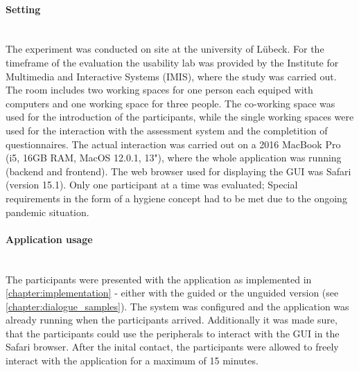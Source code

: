 \documentclass[11pt,a4paper,english]{scrreprt}
\begin{document}
\paragraph{Setting}\mbox{} \\
The experiment was conducted on site at the university of Lübeck. For the timeframe of the evaluation the usability lab was provided by the Institute for Multimedia and Interactive Systems (IMIS), where the study was carried out. The room includes two working spaces for one person each equiped with computers and one working space for three people. The co-working space was used for the introduction of the participants, while the single working spaces were used for the interaction with the assessment system and the completition of questionnaires. The actual interaction was carried out on a 2016 MacBook Pro (i5, 16GB RAM, MacOS 12.0.1, 13"), where the whole application was running (backend and frontend). The web browser used for displaying the GUI was Safari (version 15.1). Only one participant at a time was evaluated; Special requirements in the form of a hygiene concept had to be met due to the ongoing pandemic situation.

\paragraph{Application usage}\mbox{} \\
The participants were presented with the application as implemented in \autoref{chapter:implementation} - either with the guided or the unguided version (see \autoref{chapter:dialogue_samples}). The system was configured and the application was already running when the participants arrived. Additionally it was made sure, that the participants could use the peripherals to interact with the GUI in the Safari browser. After the inital contact, the participants were allowed to freely interact with the application for a maximum of 15 minutes.
\end{document}
